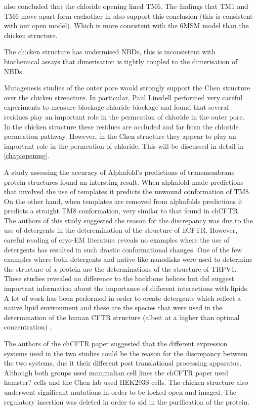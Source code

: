 \cite{gao2015} also concluded that the chloride opening lined TM6. The findings that TM1 and TM6 move apart form eachother in \cite{negoda2018} also support this conclusion (this is consistent with our open model). Which is more consistent with the 6MSM model than the chicken structure.

The chicken structure has undermised NBDs, this is inconsistent with biochemical assays that dimerisation is tightly coupled to the dimerisation of NBDs\cite{vergani2005, yeh2021}.

Mutagenesis studies of the outer pore would strongly support the Chen structure over the chicken streucture. In particular, Paul Linsdell performed very careful experiments to measure blockage chloride blockage and found that several residues play an important role in the permeation of chloride in the outer pore. In the chicken structure these residues are occluded and far from the chloride permeation pathway. However, in the Chen structure they appear to play an important role in the permeation of chloride. This will be discussed in detail in \ref{chap:opening}.

A study assessing the accuracy of Alphafold's predictions of transmembrane protein structures found an intersting result. When alphafold made predictions that involved the use of templates it predicts the unwound conformation of TM8. On the other hand, when templates are removed from alphafolds predictions it predicts a straight TM8 conformation, very similar to that found in chCFTR. The authors of this study suggested the reason for the discrepancy was due to the use of detergents in the deteremination of the structure of hCFTR. However, careful reading of cryo-EM literature reveals no examples where the use of detergents has resulted in such drastic conformational changes. One of the few examples where both detergents and native-like nanodisks were used to determine the structure of a protein are the determinations of the structure of TRPV1. These studies revealed no difference to the backbone helices but did suggest important information about the importance of different interactions with lipids\cite{gao2016}. A lot of work has been performed in order to create detergents which reflect a native lipid environment and these are the species that were used in the determination of the human CFTR structure (albeit at a higher than optimal concentration) \cite{gao2016, zhang2018, kampjut2021}. 

The authors of the chCFTR paper suggested that the different expression systems used in the two studies could be the reason for the discrepancy between the two systems, due it their different post translational processing apparatus. Although both groups used mammalian cell lines the chCFTR paper used hamster? cells \cite{aleksandrov2015} and the Chen lab used HEK293S cells. The chicken structure also underwent significant mutations in order to be locked open and imaged. The regulatory insertion was deleted in order to aid in the purification of the protein. 

